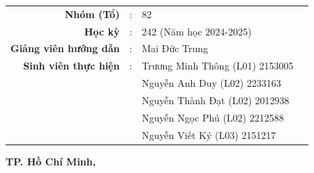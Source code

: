 \begin{titlepage}
\begin{tcolorbox}[width=16cm, height=24.7cm, colframe=black, colback=white, boxrule=2pt, left=0pt, right=0pt, top=0pt, bottom=0pt]
\begin{minipage}[t][24.7cm][s]{\linewidth}
            \vfill
            {
                \normalsize
                \begin{tabular}{rcll}
                    \textbf{Nhóm (Tổ)                } & : & 82                              \\
                    \textbf{Học kỳ              }      & : & 242 (Năm học 2024-2025)         \\
                    \textbf{Giảng viên hướng dẫn}      & : & Mai Đức Trung                   \\
                    \textbf{Sinh viên thực hiện }      & : & Trương Minh Thông (L01) 2153005 \\
                                                       &   & Nguyễn Anh Duy (L02) 2233163    \\
                                                       &   & Nguyễn Thành Đạt (L02) 2012938  \\
                                                       &   & Nguyễn Ngọc Phú (L02) 2212588   \\
                                                       &   & Nguyễn Viết Ký (L03) 2151217    \\
                \end{tabular}
                \vspace{1cm}


                \textbf{{TP. Hồ Chí Minh, \VNDate}}
            }
            \vspace{1cm}
        \end{minipage}
    \end{tcolorbox}
\end{titlepage}